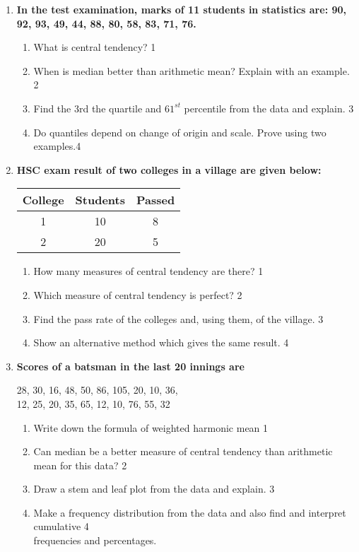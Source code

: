 \documentclass[a4paper,oneside]{book}
\begin{document}
\begin{enumerate}
    \item
  \textbf{In the test examination, marks of 11 students in statistics are: 90, 92, 93, 49, 44, 88, 80, 58, 83, 71, 76.}
  \begin{enumerate}
    \item
	What is central tendency? \hfill 1
    \item
	When is median better than arithmetic mean? Explain with an example. \hfill 2
    \item  
	Find the 3rd the quartile and $61^{st}$ percentile from the data and explain.  \hfill 3
    \item
	Do quantiles depend on change of origin and scale. Prove using two examples.\hfill 4
\end{enumerate}

 \item
	  \textbf{HSC exam result of two colleges in a village are given below:} 
	  
	  \begin{table}[h]
	  \centering
\begin{tabular}{c|c|c}
College & Students & Passed \\ \hline
1 & 10 & 8 \\ \hline
2 & 20 & 5
\end{tabular}
\end{table}
  
  \begin{enumerate}
    \item
	How many measures of central tendency are there? \hfill 1
    \item
	Which measure of central tendency is perfect? \hfill 2
    \item  
	Find the pass rate of the colleges and, using them, of the village. \hfill 3
    \item
	Show an alternative method which gives the same result. \hfill 4
  \end{enumerate}

      \item
  \textbf{Scores of a batsman in the last 20 innings are} 
   \begin{center}
  	 28, 30, 16, 48, 50, 86, 105, 20, 10, 36, \\
  	 12, 25, 20, 35, 65, 12, 10, 76, 55, 32
  	 \end{center}
  \begin{enumerate}
    \item
	Write down the formula of weighted harmonic mean \hfill 1
    \item
	Can median be a better measure of central tendency than arithmetic mean for this data?  \hfill 2
    \item  
	Draw a stem and leaf plot from the data and explain.  \hfill 3
    \item
	Make a frequency distribution from the data and also find and interpret cumulative  \hfill 4 \\ frequencies and percentages.
\end{enumerate}


\end{enumerate}
\end{document}
